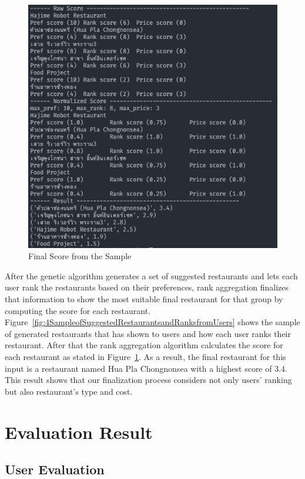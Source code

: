 \documentclass[12pt,oneside,openright,a4paper]{cpe-english-project}
\begin{document}
\begin{figure}[H]\centering
\includegraphics[width=350pt]{./images/4FinalScorefromtheSample.png}
\caption{Final Score from the Sample}\label{fig:4FinalScorefromtheSample}
\end{figure}

After the genetic algorithm generates a set of suggested restaurants and lets each user rank the restaurants based on their preferences, rank aggregation finalizes that information to show the most suitable final restaurant for that group by computing the score for each restaurant. Figure~\ref{fig:4SampleofSuggestedRestaurantsandRanksfromUsers} shows the sample of generated restaurants that has shown to users and how each user ranks their restaurant. After that the rank aggregation algorithm calculates the score for each restaurant as stated in Figure~\ref{fig:4FinalScorefromtheSample}. As a result, the final restaurant for this input is a restaurant named Hua Pla Chongnonsea with a highest score of 3.4. This result shows that our finalization process considers not only users’ ranking but also restaurant’s type and cost.


\section{Evaluation Result}

\subsection{User Evaluation}
\end{document}
